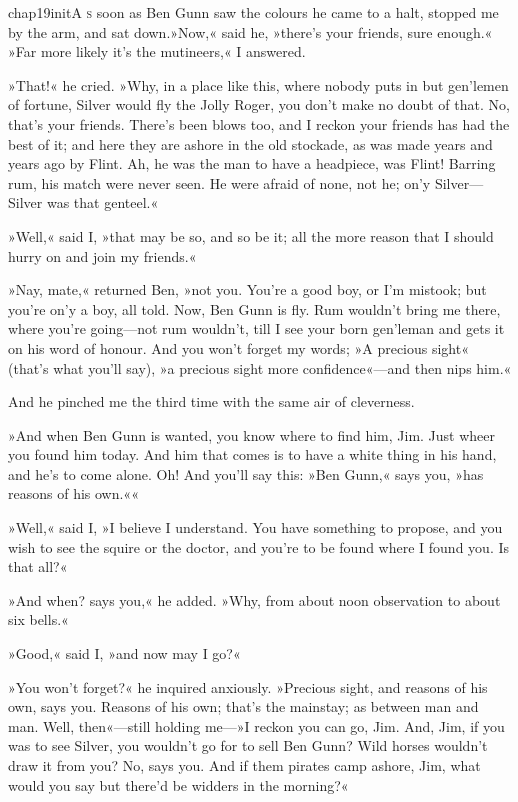 
   \lettrine[lines=4,image=true]{chap19initA}{ s} soon as Ben Gunn saw the colours he came to a halt, stopped me by the arm, and sat down.»Now,« said he, »there's your friends, sure enough.« »Far more likely it's the mutineers,« I answered.

»That!« he cried. »Why, in a place like this, where nobody puts in but gen'lemen of fortune, Silver would fly the Jolly Roger, you don't make no doubt of that. No, that's your friends. There's been blows too, and I reckon your friends has had the best of it; and here they are ashore in the old stockade, as was made years and years ago by Flint. Ah, he was the man to have a headpiece, was Flint! Barring rum, his match were never seen. He were afraid of none, not he; on'y Silver—Silver was that genteel.«

»Well,« said I, »that may be so, and so be it; all the more reason that I should hurry on and join my friends.«

»Nay, mate,« returned Ben, »not you. You're a good boy, or I'm mistook; but you're on'y a boy, all told. Now, Ben Gunn is fly. Rum wouldn't bring me there, where you're going—not rum wouldn't, till I see your born gen'leman and gets it on his word of honour. And you won't forget my words; »A precious sight« (that's what you'll say), »a precious sight more confidence«—and then nips him.«

And he pinched me the third time with the same air of cleverness.

»And when Ben Gunn is wanted, you know where to find him, Jim. Just wheer you found him today. And him that comes is to have a white thing in his hand, and he's to come alone. Oh! And you'll say this: »Ben Gunn,« says you, »has reasons of his own.««

»Well,« said I, »I believe I understand. You have something to propose, and you wish to see the squire or the doctor, and you're to be found where I found you. Is that all?«

»And when? says you,« he added. »Why, from about noon observation to about six bells.«

»Good,« said I, »and now may I go?«

»You won't forget?« he inquired anxiously. »Precious sight, and reasons of his own, says you. Reasons of his own; that's the mainstay; as between man and man. Well, then«—still holding me—»I reckon you can go, Jim. And, Jim, if you was to see Silver, you wouldn't go for to sell Ben Gunn? Wild horses wouldn't draw it from you? No, says you. And if them pirates camp ashore, Jim, what would you say but there'd be widders in the morning?«

